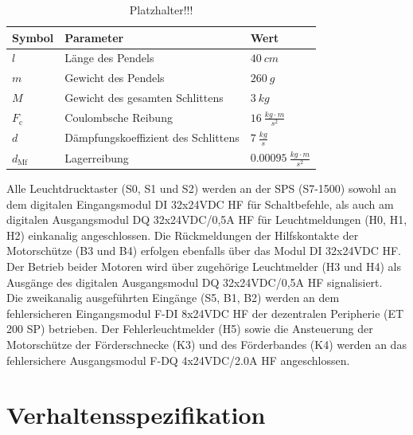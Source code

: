 \documentclass[
	pagesize,
	fontsize=12pt,
	paper=a4,
	oneside,
   reqno
]{scrartcl}
\begin{document}
\begin{table}[H]
    \centering
    \begin{tabular}{lll}
        \hline
        Symbol   & Parameter                           & Wert                                   \\ \hline
        $l$      & Länge des Pendels                   & $\SI{40}{cm}$                          \\
        $m$      & Gewicht des Pendels                 & $\SI{260}{g}$                          \\
        $M$      & Gewicht des gesamten Schlittens     & $\SI{3}{kg}$                           \\
        $F_{\mathrm{c}}$    & Coulombsche Reibung                 & $\SI{16}{\frac{kg \cdot m}{s^2}}$      \\
        $d$      & Dämpfungskoeffizient des Schlittens & $\SI{7}{\frac{kg}{s}}$                 \\
        $d_{\mathrm{Mf}}$ & Lagerreibung                        & $\SI{0.00095}{\frac{kg \cdot m}{s^2}}$ \\ \hline
    \end{tabular}
    \caption{Platzhalter!!!}
    \label{tab:my-table1}
\end{table}

Alle Leuchtdrucktaster (S0, S1 und S2) werden an der SPS (S7-1500) sowohl an dem digitalen Eingangsmodul \glqq DI 32x24VDC HF\grqq{} für Schaltbefehle, als auch am digitalen Ausgangsmodul \glqq DQ 32x24VDC/0,5A HF\grqq{} für Leuchtmeldungen (H0, H1, H2) einkanalig angeschlossen. Die Rückmeldungen der Hilfskontakte der Motorschütze (B3 und B4) erfolgen ebenfalls über das Modul \glqq DI 32x24VDC HF\grqq{}. Der Betrieb beider Motoren wird über zugehörige Leuchtmelder (H3 und H4) als Ausgänge des digitalen Ausgangsmodul \glqq DQ 32x24VDC/0,5A HF\grqq{} signalisiert. \\
Die zweikanalig ausgeführten Eingänge (S5, B1, B2) werden an dem fehlersicheren Eingangsmodul \glqq F-DI 8x24VDC HF\grqq{} der dezentralen Peripherie (ET 200 SP) betrieben. Der Fehlerleuchtmelder (H5) sowie die Ansteuerung der Motorschütze der Förderschnecke (K3) und des Förderbandes (K4) werden an das fehlersichere Ausgangsmodul \glqq F-DQ 4x24VDC/2.0A HF\grqq{} angeschlossen.

\section{Verhaltensspezifikation}
\end{document}
